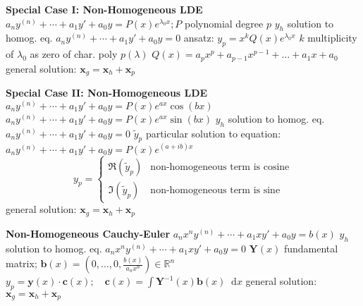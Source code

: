 \documentclass[10pt, a4paper]{article}
\newcommand*\diff{\mathop{}\!\mathrm{d}} %
\newcommand{\R}{\mathbb{R}} %
\begin{document}
\begin{multicols}{2}
\textbf{Special Case I: Non-Homogeneous LDE} \newline
$ a_n y^{(n)} + \cdots + a_1 y' + a_0y = P(x) e^{\lambda_0 x}; P$ polynomial degree $ p $  \vspace{0.5mm} \newline
$ y_h $ solution to homog. eq. $ a_n y^{(n)} + \cdots + a_1 y' + a_0y = 0 $  \vspace{0.5mm} \newline
ansatz: $ y_p = x^k Q(x) e^{\lambda_0 x}$  \newline
$ k $ multiplicity of $ \lambda_0 $ as zero of char. poly $ p(\lambda) $ \newline
$ Q(x) = a_p x^p + a_{p-1}x^{p-1} + \dots + a_1 x + a_0$\newline 
general solution: $ \bm{x}_g = \bm{x}_h + \bm{x}_p $


\textbf{Special Case II: Non-Homogeneous LDE} \newline
$ a_n y^{(n)} + \cdots + a_1 y' + a_0y = P(x)e^{a x}\cos(bx) $ \newline
$ a_n y^{(n)} + \cdots + a_1 y' + a_0y = P(x)e^{a x}\sin(bx) $ \newline
$ y_h $ solution to homog. eq. $ a_n y^{(n)} + \cdots + a_1 y' + a_0y = 0 $  \vspace{0.5mm} \newline
$ \tilde{y}_p $ particular solution to equation: \newline  $ a_n y^{(n)} + \cdots + a_1 y' + a_0y = P(x) e^{(a + ib)x} $ \vspace{-3mm} \newline
\[
	y_p  = 
	\begin{cases}
		\Re(\tilde{y}_p) & \text{non-homogeneous term is cosine} \\[1.0ex]
		\Im(\tilde{y}_p) & \text{non-homogeneous term is sine}
	\end{cases}
\] \vspace{-3mm} \newline
general solution: $ \bm{x}_g = \bm{x}_h + \bm{x}_p $
\vspace{1mm}

\textbf{Non-Homogeneous Cauchy-Euler} \newline
$ a_n x^n y^{(n)} + \cdots + a_1 x y' + a_0 y = b(x) $ \newline
$ y_h $ solution to homog. eq. $ a_n x^n y^{(n)} + \cdots + a_1 x y' + a_0 y = 0 $ \newline 
$ \mathbf{Y}(x) $ fundamental matrix; $ \bm{b}(x) = \left (0, \dots, 0, \frac{b(x)}{a_n x^n}\right ) \in \R^n$
\newline 
$ y_p = \bm{y}(x) \cdot \bm{c}(x); \quad \bm{c}(x) = \int \mathbf{Y}^{-1}(x) \bm{b}(x) \diff x $ \vspace{0.5mm}\newline
general solution: $ \bm{x}_g = \bm{x}_h + \bm{x}_p $
\vspace{1mm}


\end{multicols}
\end{document}
